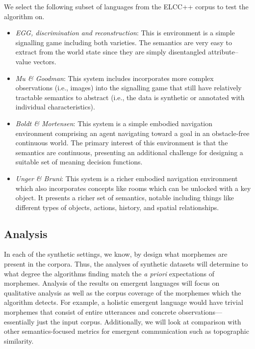 We select the following subset of languages from the ELCC++ corpus to test the algorithm on.
\begin{itemize}
  \item \emph{EGG, discrimination and reconstruction}:
    This is environment is a simple signalling game including both varieties.
    The semantics are very easy to extract from the world state since they are simply disentangled attribute--value vectors.
    \citep{kharitonov-etal-2019-egg}
  \item \emph{Mu \& Goodman}:
    This system includes incorporates more complex observations (i.e., images) into the signalling game that still have relatively tractable semantics to abstract (i.e., the data is synthetic or annotated with individual characteristics).
    \citep{mu2021generalizations}
  \item \emph{Boldt \& Mortensen}:
    This system is a simple embodied navigation environment comprising an agent navigating toward a goal in an obstacle-free continuous world.
    The primary interest of this environment is that the semantics are continuous, presenting an additional challenge for designing a suitable set of meaning decision functions.
    \citep{boldt2023mathmodel}
  \item \emph{Unger \& Bruni}:
    This system is a richer embodied navigation environment which also incorporates concepts like rooms which can be unlocked with a key object.
    It presents a richer set of semantics, notable including things like different types of objects, actions, history, and spatial relationships.
    \citep{unger2020GeneralizingEC}
\end{itemize}


\subsection{Analysis}

In each of the synthetic settings, we know, by design what morphemes are present in the corpora.
Thus, the analyses of synthetic datasets will determine to what degree the algorithms finding match the \emph{a priori} expectations of morphemes.
Analysis of the results on emergent languages will focus on qualitative analysis as well as
  the corpus coverage of the morphemes which the algorithm detects.
For example, a holistic emergent language would have trivial morphemes that consist of entire utterances and concrete observations---essentially just the input corpus.
Additionally, we will look at comparison with other semantics-focused metrics for emergent communication such as topographic similarity.
